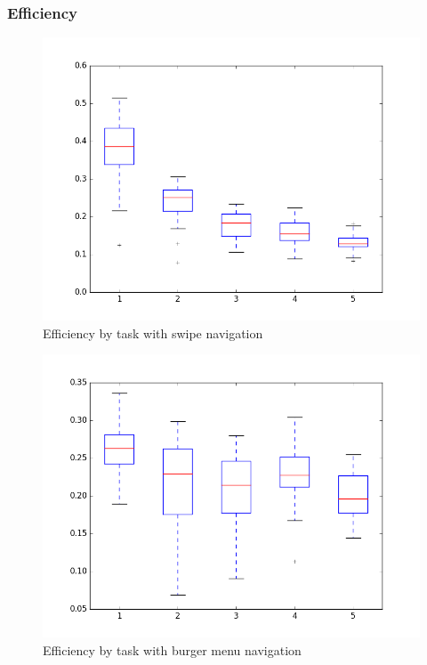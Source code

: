 \documentclass{sig-alternate-05-2015}
\begin{document}
\subsubsection{Efficiency}

\begin{figure}[h]
  \centering
  \includegraphics[width=\columnwidth]{pics/swipe_boxplot.png}
  \caption{Efficiency by task with swipe navigation}\label{fig:swipebox}
\end{figure}

\begin{figure}[h]
  \centering
  \includegraphics[width=\columnwidth]{pics/burger_boxplot.png}
  \caption{Efficiency by task with burger menu navigation}\label{fig:burgerbox}
\end{figure}
\end{document}
